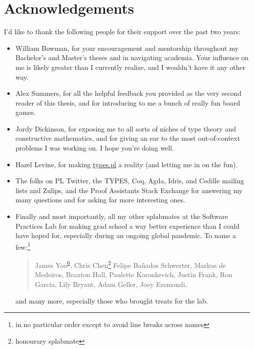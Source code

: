 \chapter{Acknowledgements}

I'd like to thank the following people for their support over the past two years:

\begin{itemize}
  \item William Bowman, for your encouragement and mentorship throughout my Bachelor's and Master's theses
    and in navigating academia.
    Your influence on me is likely greater than I currently realize,
    and I wouldn't have it any other way.
  \item Alex Summers, for all the helpful feedback you provided as the very second reader of this thesis,
    and for introducing to me a bunch of really fun board games.
  \item Jordy Dickinson, for exposing me to all sorts of niches of type theory and constructive mathematics,
    and for giving an ear to the most out-of-context problems I was working on.
    I hope you're doing well.
  \item Hazel Levine, for making \href{https://types.pl/}{types.pl} a reality (and letting me in on the fun).
  \item The folks on PL Twitter, the TYPES, Coq, Agda, Idris, and Cedille mailing lists and Zulips,
    and the Proof Assistants Stack Exchange for answering my many questions
    and for asking far more interesting ones.
  \item Finally and most importantly, all my other splabmates at the Software Practices Lab
    for making grad school a way better experience than I could have hoped for,
    especially during an ongoing global pandemic.
    To name a few:\footnote{in no particular order except to avoid line breaks across names}
    \vspace{-0.25\baselineskip}
    \begin{quote}
    James Yoo\textsuperscript{\href{https://youtu.be/dQw4w9WgXcQ}{0}}, Chris Chen\punctstack{,}\footnote{honourary splabmate}
    Felipe Ba\~nados Schwerter, Markus de Medeiros, 
    Braxton Hall, Paulette Koronkevich, Justin Frank, Ron Garcia, Lily Bryant,
    Adam Geller, Joey Eremondi,
    \end{quote}
    \vspace{-0.5\baselineskip}
    and many more, especially those who brought treats for the lab.
\end{itemize}

